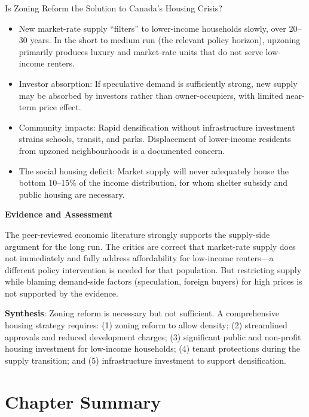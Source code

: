 \begin{policydebate}{Is Zoning Reform the Solution to Canada's Housing Crisis?}
\begin{itemize}
  \item New market-rate supply ``filters'' to lower-income households slowly, over 20--30 years. In the short to medium run (the relevant policy horizon), upzoning primarily produces luxury and market-rate units that do not serve low-income renters.
  \item Investor absorption: If speculative demand is sufficiently strong, new supply may be absorbed by investors rather than owner-occupiers, with limited near-term price effect.
  \item Community impacts: Rapid densification without infrastructure investment strains schools, transit, and parks. Displacement of lower-income residents from upzoned neighbourhoods is a documented concern.
  \item The social housing deficit: Market supply will never adequately house the bottom 10--15\% of the income distribution, for whom shelter subsidy and public housing are necessary.
\end{itemize}

\textbf{Evidence and Assessment}

The peer-reviewed economic literature strongly supports the supply-side argument for the long run. The critics are correct that market-rate supply does not immediately and fully address affordability for low-income renters---a different policy intervention is needed for that population. But restricting supply while blaming demand-side factors (speculation, foreign buyers) for high prices is not supported by the evidence.

\textbf{Synthesis}: Zoning reform is necessary but not sufficient. A comprehensive housing strategy requires: (1) zoning reform to allow density; (2) streamlined approvals and reduced development charges; (3) significant public and non-profit housing investment for low-income households; (4) tenant protections during the supply transition; and (5) infrastructure investment to support densification.
\end{policydebate}

\section*{Chapter Summary}

